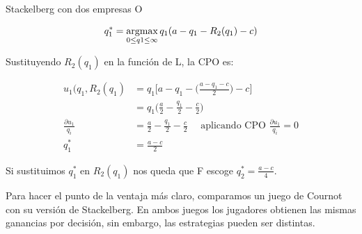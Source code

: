 \documentclass[12pt]{scrartcl}
\begin{document}
\begin{exbox}{Stackelberg con dos empresas}
	O
	    
	\[q_1^* = \operatorname*{argmax}_{0\leq q1 \leq \infty} q_1(a - q_1 - R_2(q_1) - c) \]
	
	Sustituyendo $R_2(q_1)$ en la función de L, la CPO es: 
	    
	\begin{align*}
		u_1(q_1, R_2(q_1)        & = q_1 \Big[a - q_1 -  \Big (\frac{a-q_1-c}{2}  \Big) - c \Big]                                  \\
		                         & =q_1 \Bigg (\frac{a}{2} - \frac{q_1}{2} -\frac{c}{2}\Bigg)                                      \\
		\frac{\partial u_1}{q_i} & = \frac{a}{2} - \frac{q_1}{2}-\frac{c}{2}\quad \text{ aplicando CPO }\frac{\partial u_1}{q_i}=0 \\
		q_1^*                    & = \frac{a-c}{2}                                                                                 
	\end{align*}
	    
	Si sustituimos $q_1^*$ en $R_2(q_1)$ nos queda que F escoge $q_2^* = \frac{a-c}{4}$.
	    
\end{exbox}

Para hacer el punto de la ventaja más claro, comparamos un juego de Cournot con su versión de Stackelberg. En ambos juegos los jugadores obtienen las mismas ganancias por decisión, sin embargo, las estrategias pueden ser distintas.
\end{document}
